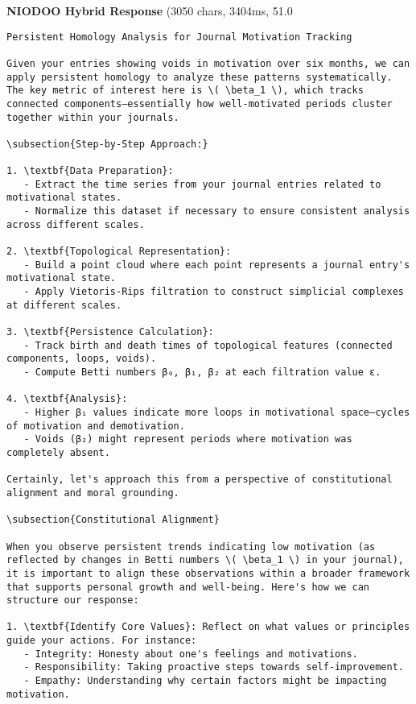 \documentclass[11pt,a4paper]{article}
\begin{document}
\textbf{NIODOO Hybrid Response} (3050 chars, 3404ms, 51.0%
\begin{verbatim}Persistent Homology Analysis for Journal Motivation Tracking

Given your entries showing voids in motivation over six months, we can apply persistent homology to analyze these patterns systematically. The key metric of interest here is \( \beta_1 \), which tracks connected components—essentially how well-motivated periods cluster together within your journals.

\subsection{Step-by-Step Approach:}

1. \textbf{Data Preparation}:
   - Extract the time series from your journal entries related to motivational states.
   - Normalize this dataset if necessary to ensure consistent analysis across different scales.

2. \textbf{Topological Representation}:
   - Build a point cloud where each point represents a journal entry's motivational state.
   - Apply Vietoris-Rips filtration to construct simplicial complexes at different scales.

3. \textbf{Persistence Calculation}:
   - Track birth and death times of topological features (connected components, loops, voids).
   - Compute Betti numbers β₀, β₁, β₂ at each filtration value ε.

4. \textbf{Analysis}:
   - Higher β₁ values indicate more loops in motivational space—cycles of motivation and demotivation.
   - Voids (β₂) might represent periods where motivation was completely absent.

Certainly, let's approach this from a perspective of constitutional alignment and moral grounding.

\subsection{Constitutional Alignment}

When you observe persistent trends indicating low motivation (as reflected by changes in Betti numbers \( \beta_1 \) in your journal), it is important to align these observations within a broader framework that supports personal growth and well-being. Here's how we can structure our response:

1. \textbf{Identify Core Values}: Reflect on what values or principles guide your actions. For instance:
   - Integrity: Honesty about one's feelings and motivations.
   - Responsibility: Taking proactive steps towards self-improvement.
   - Empathy: Understanding why certain factors might be impacting motivation.


\end{verbatim}
\end{document}
